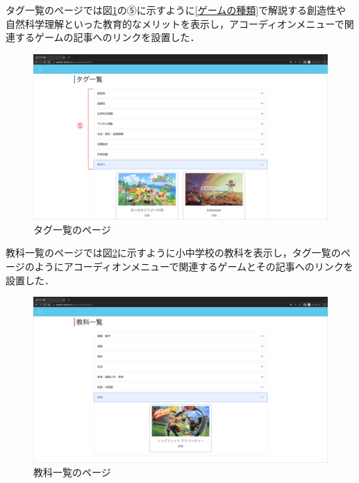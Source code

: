 \documentclass[12pt,a4j,titlepage]{ltjsarticle}
\begin{document}
タグ一覧のページでは図\ref{fig:タグページ}の⑤に示すように\ref{ゲームの種類}で解説する創造性や自然科学理解といった教育的なメリットを表示し，アコーディオンメニューで関連するゲームの記事へのリンクを設置した．

\begin{figure}[H]
\begin{center}
 \includegraphics[keepaspectratio, scale=0.15]{PDF/tagpage.pdf}
\end{center}
 \caption{タグ一覧のページ}
 \label{fig:タグページ}
\end{figure}

教科一覧のページでは図\ref{fig:教科ページ}に示すように小中学校の教科を表示し，タグ一覧のページのようにアコーディオンメニューで関連するゲームとその記事へのリンクを設置した．

\begin{figure}[H]
\begin{center}
 \includegraphics[keepaspectratio, scale=0.15]{PDF/subpage.pdf}
\end{center}
 \caption{教科一覧のページ}
 \label{fig:教科ページ}
\end{figure}
\end{document}
